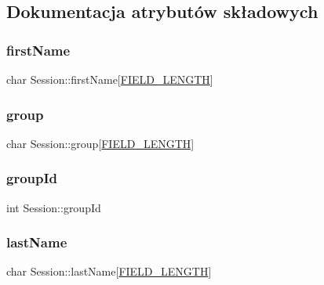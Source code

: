 \subsection{Dokumentacja atrybutów składowych}
\mbox{\label{structSession_a5f3b9f54574ac72566979221bfc5bb5a}} 
\subsubsection{\texorpdfstring{firstName}{firstName}}
{\footnotesize\ttfamily char Session\+::first\+Name\mbox{[}\mbox{\hyperlink{mydb_8h_a4e8ecaf2d59499a8c159ccdf7be1baec}{F\+I\+E\+L\+D\+\_\+\+L\+E\+N\+G\+TH}}\mbox{]}}

\mbox{\label{structSession_ad76abbf72d70359b9b3a2706183150ca}} 
\subsubsection{\texorpdfstring{group}{group}}
{\footnotesize\ttfamily char Session\+::group\mbox{[}\mbox{\hyperlink{mydb_8h_a4e8ecaf2d59499a8c159ccdf7be1baec}{F\+I\+E\+L\+D\+\_\+\+L\+E\+N\+G\+TH}}\mbox{]}}

\mbox{\label{structSession_a008e0e60299d7342dba304c88ede9d5d}} 
\subsubsection{\texorpdfstring{groupId}{groupId}}
{\footnotesize\ttfamily int Session\+::group\+Id}

\mbox{\label{structSession_af1b08553bd1e57bd5ac84c3bf84ce8e4}} 
\subsubsection{\texorpdfstring{lastName}{lastName}}
{\footnotesize\ttfamily char Session\+::last\+Name\mbox{[}\mbox{\hyperlink{mydb_8h_a4e8ecaf2d59499a8c159ccdf7be1baec}{F\+I\+E\+L\+D\+\_\+\+L\+E\+N\+G\+TH}}\mbox{]}}

